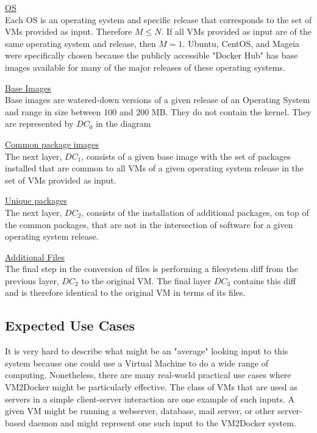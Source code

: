 \underline{OS}\\
Each OS is an operating system and specific release that corresponds to the set of VMs provided as input. Therefore $M \le N$. If all VMs provided as input are of the same operating system and release, then $M=1$. Ubuntu, CentOS, and Mageia were specifically chosen because the publicly accessible "Docker Hub" has base images available for many of the major releases of these operating systems.


\underline{Base Images}\\
Base images are watered-down versions of a given release of an Operating System and range in size between 100 and 200 MB. They do not contain the kernel. They are represented by $DC_0$ in the diagram

\underline{Common package images}\\
The next layer, $DC_1$, consists of a given base image with the set of packages installed that are common to all VMs of a given operating system release in the set of VMs provided as input.

\underline{Unique packages}\\
The next layer, $DC_2$, consists of the installation of additional packages, on top of the common packages, that are not in the intersection of software for a given operating system release.

\underline{Additional Files}\\
The final step in the conversion of files is performing a filesystem diff from the previous layer, $DC_2$ to the original VM. The final layer $DC_3$ contains this diff and is therefore identical to the original VM in terms of its files.

\subsection{Expected Use Cases}
It is very hard to describe what might be an "average" looking input to this system because one could use a Virtual Machine to do a wide range of computing. Nonetheless, there are many real-world practical use cases where VM2Docker might be particularly effective. The class of VMs that are used as servers in a simple client-server interaction are one example of such inputs. A given VM might be running a webserver, database, mail server, or other server-based daemon and might represent one such input to the VM2Docker system. 

